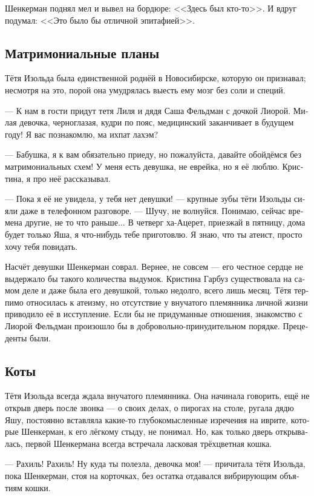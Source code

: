 \documentclass[a5paper,12pt,fleqn]{extbook}\usepackage{cooltooltips}\usepackage{polyglossia}\setdefaultlanguage[babelshorthands=true]{russian}\setotherlanguage{english}\defaultfontfeatures{Ligatures=TeX,Mapping=tex-text} \usepackage{xcolor}\definecolor{lightgray}{HTML}{bbbbbb}\color{lightgray}\newcommand{\ml}[3]{\textenglish{\textcolor{black}{#3}}}
\begin{document}
Шенкерман поднял мел и вывел на бордюре: <<Здесь был кто-то>>.
И вдруг подумал: <<Это было бы отличной эпитафией>>.

\subsection{Матримониальные планы}

Тётя Изольда была единственной роднёй в Новосибирске, которую он признавал;
несмотря на это, порой она умудрялась выесть ему мозг без соли и специй.

--- К нам в гости придут тетя Лиля и дядя Саша Фельдман с дочкой Лиорой.
Милая девочка, черноглазая, кудри по пояс, медицинский заканчивает в будущем году!
Я вас познакомлю, ма ихпат лахэм?

--- Бабушка, я к вам обязательно приеду, но пожалуйста, давайте обойдёмся без матримониальных схем!
У меня есть девушка, не еврейка, но я её люблю.
Кристина, я про неё рассказывал.

--- Пока я её не увидела, у тебя нет девушки! --- крупные зубы тёти Изольды сияли даже в телефонном разговоре.
--- Шучу, не волнуйся.
Понимаю, сейчас времена другие, не то что раньше...
В четверг ха-Ацерет, приезжай в пятницу, дома будет только Яша, я что-нибудь тебе приготовлю.
Я знаю, что ты атеист, просто хочу тебя повидать.

Насчёт девушки Шенкерман соврал.
Вернее, не совсем --- его честное сердце не выдержало бы такого количества выдумок.
Кристина Гарбуз существовала на самом деле и даже была его девушкой, только недолго, всего лишь месяц.
Тётя терпимо относилась к атеизму, но отсутствие у внучатого племянника личной жизни приводило её в исступление.
Если бы не придуманные отношения, знакомство с Лиорой Фельдман произошло бы в добровольно-принудительном порядке.
Прецеденты были.

\subsection{Коты}

Тётя Изольда всегда ждала внучатого племянника.
Она начинала говорить, ещё не открыв дверь после звонка --- о своих делах, о пирогах на столе, ругала дядю Яшу, постоянно вставляла какие-то глубокомысленные изречения на иврите, которые Шенкерман, к его лёгкому стыду, не понимал.
Но, как только дверь открывалась, первой Шенкермана всегда встречала ласковая трёхцветная кошка.

--- Рахиль!
Рахиль!
Ну куда ты полезла, девочка моя! --- причитала тётя Изольда, пока Шенкерман, стоя на корточках, без остатка отдавался вибрирующим объятиям кошки.
\end{document}
